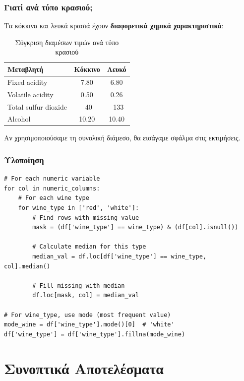 \documentclass[12pt,a4paper]{article}
\begin{document}
\subsubsection{\textgreek{Γιατί ανά τύπο κρασιού;}}

\textgreek{Τα κόκκινα και λευκά κρασιά έχουν} \textbf{\textgreek{διαφορετικά χημικά χαρακτηριστικά}}:

\begin{table}[H]
\centering
\caption{\textgreek{Σύγκριση διαμέσων τιμών ανά τύπο κρασιού}}
\begin{tabular}{@{}lcc@{}}
\toprule
\textbf{\textgreek{Μεταβλητή}} & \textbf{\textgreek{Κόκκινο}} & \textbf{\textgreek{Λευκό}} \\
\midrule
Fixed acidity & 7.80 & 6.80 \\
Volatile acidity & 0.50 & 0.26 \\
Total sulfur dioxide & ~40 & ~133 \\
Alcohol & 10.20 & 10.40 \\
\bottomrule
\end{tabular}
\end{table}

\textgreek{Αν χρησιμοποιούσαμε τη συνολική διάμεσο, θα εισάγαμε σφάλμα στις εκτιμήσεις.}

\subsubsection{\textgreek{Υλοποίηση}}

\begin{lstlisting}[caption={Fill missing values with median}]
# For each numeric variable
for col in numeric_columns:
    # For each wine type
    for wine_type in ['red', 'white']:
        # Find rows with missing value
        mask = (df['wine_type'] == wine_type) & (df[col].isnull())
        
        # Calculate median for this type
        median_val = df.loc[df['wine_type'] == wine_type, col].median()
        
        # Fill missing with median
        df.loc[mask, col] = median_val

# For wine_type, use mode (most frequent value)
mode_wine = df['wine_type'].mode()[0]  # 'white'
df['wine_type'] = df['wine_type'].fillna(mode_wine)
\end{lstlisting}

\section{\textgreek{Συνοπτικά Αποτελέσματα}}
\end{document}
